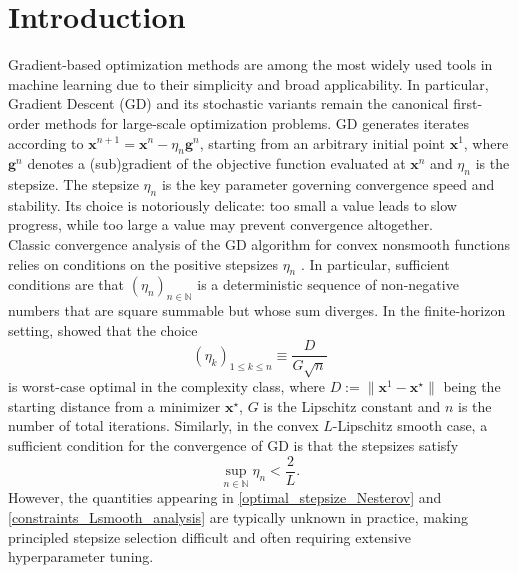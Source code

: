 \documentclass[11pt]{article}
\theoremstyle{plain}
\theoremstyle{definition}
\theoremstyle{remark}
\newcommand{\bx}{\bm{x}}
\newcommand{\buu}{\bm{g}}
\newcommand{\iter}{n}
\newcommand{\ite}{k}
\newcommand{\N}{\mathbb{N}}
\begin{document}
\section{Introduction} 

Gradient-based optimization methods are among the most widely used tools in machine learning due to their simplicity and broad applicability. In particular, Gradient Descent (GD) and its stochastic variants remain the canonical first-order methods for large-scale optimization problems. GD generates iterates according to
$\bx^{\iter+1} = \bx^\iter - \eta_\iter \buu^\iter$, starting from an arbitrary initial point $\bx^1$, where $\buu^\iter$ denotes a (sub)gradient of the objective function evaluated at $\bx^\iter$ and $\eta_\iter$ is the stepsize. The stepsize $\eta_\iter$ is the key parameter governing convergence speed and stability. Its choice is notoriously delicate: too small a value leads to slow progress, while too large a value may prevent convergence altogether. \\

\noindent
Classic convergence analysis of the GD algorithm for convex nonsmooth functions relies on conditions on 
the positive stepsizes $ \eta_\iter $ \cite{robbins&monro}. 
In particular, sufficient conditions are that $ (\eta_\iter)_{\iter\in \N}$ is a deterministic sequence 
of non-negative numbers that are square summable but whose sum diverges.  %
In the finite-horizon setting, \citet{nesterov2018lectures} showed that the choice 
\begin{equation}\label{optimal_stepsize_Nesterov}
    (\eta_\ite)_{1\leq \ite\leq \iter} \equiv \frac{D}{G\sqrt{\iter}}
\end{equation}
is worst-case optimal in the complexity class, where $D := \lVert \bx^1 - \bx^\star \rVert$ being the starting distance from a minimizer $\bx^\star$, $G$ is the Lipschitz constant and $\iter$ is the number of total iterations. 
Similarly, in the convex $L$-Lipschitz smooth case, a sufficient condition for the convergence of GD is that the stepsizes satisfy
\begin{equation}\label{constraints_Lsmooth_analysis}
    \sup_{n\in\N}\eta_n < \frac{2}{L}.
\end{equation}
However, the quantities appearing in \eqref{optimal_stepsize_Nesterov} and \eqref{constraints_Lsmooth_analysis} are typically unknown in practice, making principled stepsize selection difficult and often requiring extensive hyperparameter tuning. \\
\end{document}
